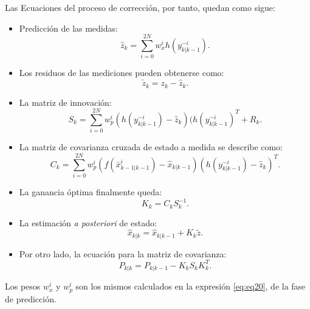 \begin{enumerate}
Las Ecuaciones del proceso de correcci\'on, por tanto, quedan como sigue:
\begin{itemize}
\item Predicci\'on de las medidas:\\
\begin{equation}
\label{eq:eq25}
\hat{z}_{k} = \sum_{i=0}^{2N} w_x^i h(y_{k|k-1}^{-i}).
\end{equation}
\item Los residuos de las mediciones pueden obtenerse como:\\
\begin{equation}
\tilde{z}_k = z_k - \hat{z}_k.
\label{eq:eq26}
\end{equation}
\item La matriz de innovaci\'on:\\
\begin{equation}
S_k = \sum_{i=0}^{2N} w_p^i (h(y_{k|k-1}^{-i}) - \hat{z}_k)(h(y_{k|k-1}^{-i})^T + R_k.
\label{eq:eq27}
\end{equation}
\item La matriz de covarianza cruzada de estado a medida se describe como:\\
\begin{equation}
C_k = \sum_{i=0}^{2N} w_p^i ( f(\bar{x}^i_{k-1 | k-1})- \hat{x}_{k|k-1} )( h(y_{k|k-1}^{-i}) - \hat{z}_k )^T.
\label{eq:eq28}
\end{equation}
\item La ganancia \'optima finalmente queda:\\
\begin{equation}
K_k = C_kS_k^{-1}.
\label{eq:eq29}
\end{equation}
\item La estimaci\'on \textit{a posteriori} de estado:\\
\begin{equation}
\label{eq:eq30}
 \hat{x}_{k|k} =  \hat{x}_{k|k-1} + K_k \tilde{z}.
\end{equation}
\item Por otro lado, la ecuaci\'on para la matriz de covarianza:\\
\begin{equation}
\label{eq:eq31}
P_{k|k} = P_{k|k-1} - K_kS_kK_k^T.
\end{equation}
\end{itemize}
Los pesos $w_x^i$ y $w_p^i$ son los mismos calculados en la expresi\'on \ref{eq:eq20}, de la fase de predicci\'on.
\end{enumerate}

